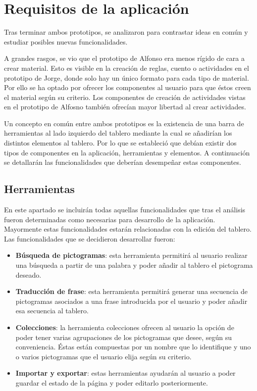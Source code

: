 \section{Requisitos de la aplicación}

Tras terminar ambos prototipos, se analizaron para contrastar ideas en común y estudiar posibles nuevas funcionalidades.

A grandes rasgos, se vio que el prototipo de Alfonso era menos rígido de cara a crear material. Esto es visible en la creación de reglas, cuento o actividades en el prototipo de Jorge, donde solo hay un único formato para cada tipo de material. Por ello se ha optado por ofrecer los componentes al usuario para que éstos creen el material según su criterio. Los componentes de creación de actividades vistas en el prototipo de Alfosno también ofrecían mayor libertad al crear actividades. 

Un concepto en común entre ambos prototipos es la existencia de una barra de herramientas al lado izquierdo del tablero mediante la cual se añadirían los distintos elementos al tablero. Por lo que se estableció que debían existir dos tipos de componentes en la aplicación, herramientas y elementos. A continuación se detallarán las funcionalidades que deberían desempeñar estas componentes. 

\subsection{Herramientas}

En este apartado se incluirán todas aquellas funcionalidades que tras el análisis fueron determinadas como necesarias para desarrollo de la aplicación. Mayormente estas funcionalidades estarán relacionadas con la edición del tablero. Las funcionalidades que se decidieron desarrollar fueron:

\begin{itemize}
	\item \textbf{Búsqueda de pictogramas}: esta herramienta permitirá al usuario realizar una búsqueda a partir de una palabra y poder añadir al tablero el pictograma deseado.
	
	\item \textbf{Traducción de frase}: esta herramienta permitirá generar una secuencia de pictogramas asociados a una frase introducida por el usuario y poder añadir esa secuencia al tablero.
	
	\item \textbf{Colecciones}: la herramienta colecciones ofrecen al usuario la opción de poder tener varias agrupaciones de los pictogramas que desee, según su conveniencia. Éstas están compuestas por un nombre que lo identifique y uno o varios pictogramas que el usuario elija según su criterio.
	
	\item \textbf{Importar y exportar}: estas herramientas ayudarán al usuario a poder guardar el estado de la página y poder editarlo posteriormente. 
\end{itemize}


